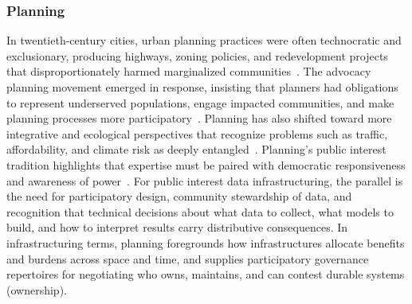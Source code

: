 \documentclass[acmsmall,screen]{acmart}
\begin{document}
\subsubsection*{Planning}
In twentieth-century cities, urban planning practices were often technocratic and exclusionary, producing highways, zoning policies, and redevelopment projects that disproportionately harmed marginalized communities~\cite{jacobs1961death,doryClashUrbanPhilosophies2018,guttenbergPlanningIdeology2009}. The advocacy planning movement emerged in response, insisting that planners had obligations to represent underserved populations, engage impacted communities, and make planning processes more participatory~\cite{dadashpoorDefiningPublicInterest2021}. Planning has also shifted toward more integrative and ecological perspectives that recognize problems such as traffic, affordability, and climate risk as deeply entangled~\cite{hirtPremodernModernPostmodern2009,roheLocalGlobalOne2009}. Planning's public interest tradition highlights that expertise must be paired with democratic responsiveness and awareness of power~\cite{lanePublicParticipationPlanning2005}. For public interest data infrastructuring, the parallel is the need for participatory design, community stewardship of data, and recognition that technical decisions about what data to collect, what models to build, and how to interpret results carry distributive consequences. In infrastructuring terms, planning foregrounds how infrastructures allocate benefits and burdens across space and time, and supplies participatory governance repertoires for negotiating who owns, maintains, and can contest durable systems (ownership).
\end{document}
